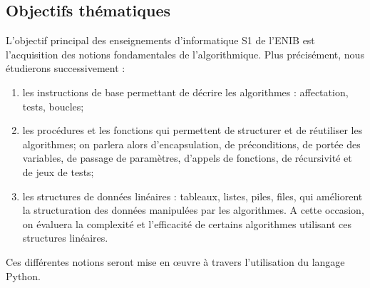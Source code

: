 \subsection{Objectifs thématiques}
L'objectif principal des enseignements d'informatique S1 de l'ENIB
est l'acquisition des notions fondamentales de l'algorithmique.
Plus précisément, nous étudierons successivement :
\begin{enumerate}
\item les instructions de base permettant de décrire les algorithmes : affectation, tests, boucles;
\item les procédures et les fonctions qui permettent de structurer et de réutiliser les algorithmes;
	on parlera alors d'encapsulation, de préconditions, de portée des variables, de passage de paramètres,
	d'appels de fonctions, de récursivité et de jeux de tests;
\item les structures de données linéaires : tableaux, listes, piles, files, qui améliorent la
	structuration des données manipulées par les algorithmes. A cette occasion, on évaluera
	la complexité et l'efficacité de certains algorithmes utilisant ces structures linéaires.
\end{enumerate}
Ces différentes notions seront mise en \oe uvre à travers l'utilisation du 
langage {\sc Python}.

